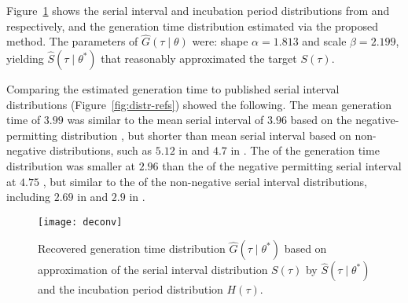 Figure~\ref{fig:deconv} shows the
serial interval and incubation period distributions
from \cite{Du2020} and \cite{Lauer2020} respectively,
and the generation time distribution estimated via the proposed method.
The \mle parameters of $\hat{G}(\tau\mid\theta)$ were:
shape ${\alpha = 1.813}$ and scale ${\beta = 2.199}$,
yielding $\hat{S}(\tau\mid\theta^*)$
that reasonably approximated the target $S(\tau)$.
\par
Comparing the estimated generation time to published serial interval distributions
(Figure~\ref{fig:distr-refs}) showed the following.
The mean generation time of $3.99$ was similar to
the mean serial interval of $3.96$
based on the negative-permitting distribution \cite{Du2020},
but shorter than mean serial interval based on non-negative distributions,
such as $5.12$ in \cite{Zhang2020} and $4.7$ in \cite{Nishiura2020}.
The \sd of the generation time distribution was smaller at $2.96$
than the \sd of the negative permitting serial interval at $4.75$ \cite{Du2020},
but similar to the \sd of the non-negative serial interval distributions,
including $2.69$ in \cite{Zhang2020} and $2.9$ in \cite{Nishiura2020}.
\par
\begin{figure}
  \centering
  \texttt{[image: deconv]}
  \caption{Recovered generation time distribution
    $\hat{G}(\tau\mid\theta^*)$
    based on \mle approximation of the serial interval distribution
    $S(\tau)$ by $\hat{S}(\tau\mid\theta^*)$
    and the incubation period distribution $H(\tau)$.}
  \label{fig:deconv}
\end{figure}
